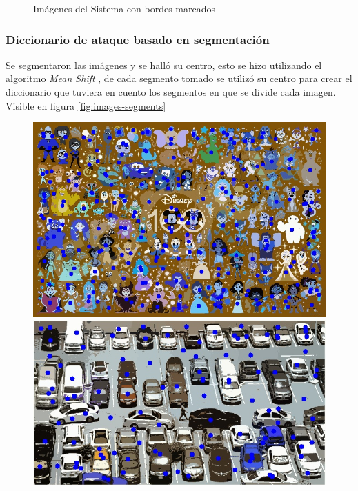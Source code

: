 \begin{figure}[ht]
\begin{minipage}[hb]{0.3\textwidth}
	\end{minipage}
	\caption{Imágenes del Sistema con bordes marcados}
	\label{fig:images-borders}
\end{figure}


\subsubsection{Diccionario de ataque basado en segmentaci\'on}
Se segmentaron las im\'agenes y se hall\'o su centro, esto se hizo utilizando el algoritmo \textit{Mean Shift} \cite{Comaniciu2002MeanSA}, de cada segmento tomado se utiliz\'o su centro para crear el diccionario que tuviera en cuento los segmentos en que se divide cada imagen. Visible en figura \ref{fig:images-segments}

\begin{figure}[H]
	\centering
	\begin{minipage}[hb]{0.3\textwidth}
		\centering
		\includegraphics[width=\textwidth]{Graphics/disney-segmented.jpg}
	\end{minipage}
	\hfill
	\begin{minipage}[hb]{0.3\textwidth}
		\centering
		\includegraphics[width=\textwidth]{Graphics/cars-segmented.jpg}

\end{minipage}
\end{figure}
